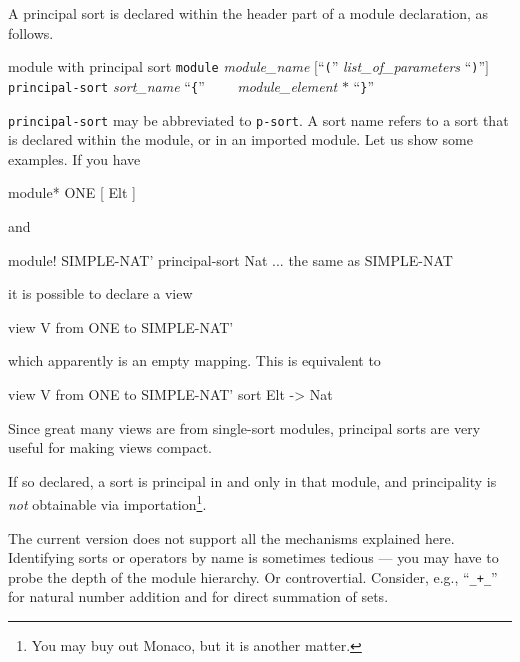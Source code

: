 \documentclass[a4paper]{memoir}
\begin{document}
A principal sort is declared within the header part of
a module declaration, as follows.

\begin{bsyntax} module with principal sort  \Hline
\texttt{module} \textit{module\_name} $[$``\texttt{(}'' \textit{list\_of\_parameters} ``\texttt{)}''$]$ \texttt{principal-sort} \textit{sort\_name} ``\texttt{\{}''  
~~~~\textit{module\_element} $*$
``\texttt{\}}''
\end{bsyntax}

\verb|principal-sort| may be abbreviated to \verb|p-sort|.
A sort name refers to a sort that is declared within the module, or in an
imported module.
Let us show some examples. If you have
\begin{vvtm}
\begin{ccode}
  module* ONE { [ Elt ] }
\end{ccode}
\end{vvtm}
and
\begin{vvtm}
\begin{ccode}
  module! SIMPLE-NAT' principal-sort Nat {
    ... the same as SIMPLE-NAT
  }
\end{ccode}
\end{vvtm}
it is possible to declare a view
\begin{vvtm}
\begin{ccode}
  view V from ONE to SIMPLE-NAT' { }
\end{ccode}
\end{vvtm}
which apparently is an empty mapping. This is equivalent to
\begin{vvtm}
\begin{ccode}
  view V from ONE to SIMPLE-NAT' { sort Elt -> Nat }
\end{ccode}
\end{vvtm}
Since great many views are from single-sort modules,
principal sorts are very useful for making views compact.

If so declared, a sort is principal in and only in that module, and
principality is {\em not} obtainable via importation\footnote{
You may buy out Monaco, but it is another matter.
}.

\begin{warning}
  The current version does not support all the mechanisms explained
  here. Identifying sorts or operators by name
  is sometimes tedious --- you may have to probe the depth of the module
  hierarchy. Or controvertial. Consider, e.g.,
  ``\verb|_+_|'' for natural number addition and for direct summation of sets.
\end{warning}
\end{document}
